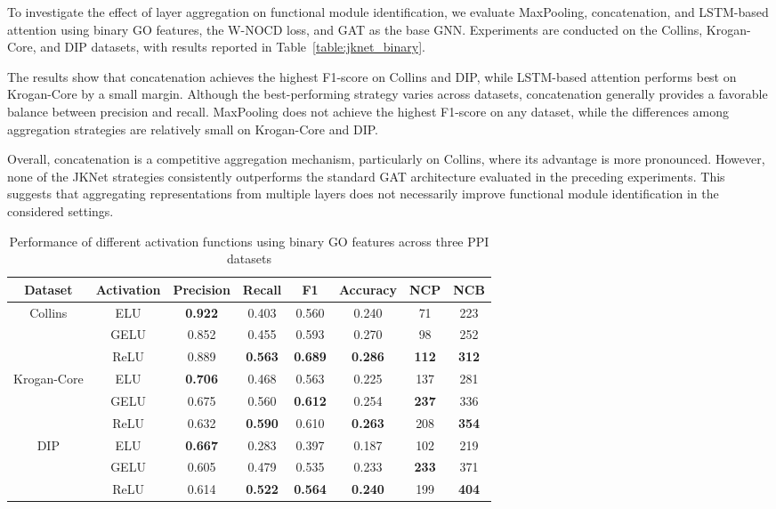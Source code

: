 To investigate the effect of layer aggregation on functional module identification, we evaluate MaxPooling, concatenation, and LSTM-based attention using binary GO features, the W-NOCD loss, and GAT as the base GNN. Experiments are conducted on the Collins, Krogan-Core, and DIP datasets, with results reported in Table~\ref{table:jknet_binary}.

The results show that concatenation achieves the highest F1-score on Collins and DIP, while LSTM-based attention performs best on Krogan-Core by a small margin. Although the best-performing strategy varies across datasets, concatenation generally provides a favorable balance between precision and recall. MaxPooling does not achieve the highest F1-score on any dataset, while the differences among aggregation strategies are relatively small on Krogan-Core and DIP.

Overall, concatenation is a competitive aggregation mechanism, particularly on Collins, where its advantage is more pronounced. However, none of the JKNet strategies consistently outperforms the standard GAT architecture evaluated in the preceding experiments. This suggests that aggregating representations from multiple layers does not necessarily improve functional module identification in the considered settings.


\begin{table}[t]
	\centering
	\caption{Performance of different activation functions using binary GO features across three PPI datasets}
	\label{table:activation_binary_go}
	\footnotesize
	\vspace{2mm}
		\begin{tabular}{c|c|c|c|c|c|c|c}
			\hline
			\textbf{Dataset} &
			\textbf{Activation} &
			\textbf{Precision} &
			\textbf{Recall} &
			\textbf{F1} &
			\textbf{Accuracy} &
			\textbf{NCP} &
			\textbf{NCB} \\
			\hline
			\multirow{3}{*}{Collins}
			& ELU  & \textbf{0.922} & 0.403 & 0.560 & 0.240 & 71  & 223 \\
			& GELU & 0.852 & 0.455 & 0.593 & 0.270 & 98  & 252 \\
			& ReLU & 0.889 & \textbf{0.563} & \textbf{0.689} & \textbf{0.286} & \textbf{112} & \textbf{312} \\
			\hline
			\multirow{3}{*}{Krogan-Core}
			& ELU  & \textbf{0.706} & 0.468 & 0.563 & 0.225 & 137 & 281 \\
			& GELU & 0.675 & 0.560 & \textbf{0.612} & 0.254 & \textbf{237} & 336 \\
			& ReLU & 0.632 & \textbf{0.590} & 0.610 & \textbf{0.263} & 208 & \textbf{354} \\
			\hline
			\multirow{3}{*}{DIP}
			& ELU  & \textbf{0.667} & 0.283 & 0.397 & 0.187 & 102 & 219 \\
			& GELU & 0.605 & 0.479 & 0.535 & 0.233 & \textbf{233} & 371 \\
			& ReLU & 0.614 & \textbf{0.522} & \textbf{0.564} & \textbf{0.240} & 199 & \textbf{404} \\
			\hline
		\end{tabular}
\end{table}

